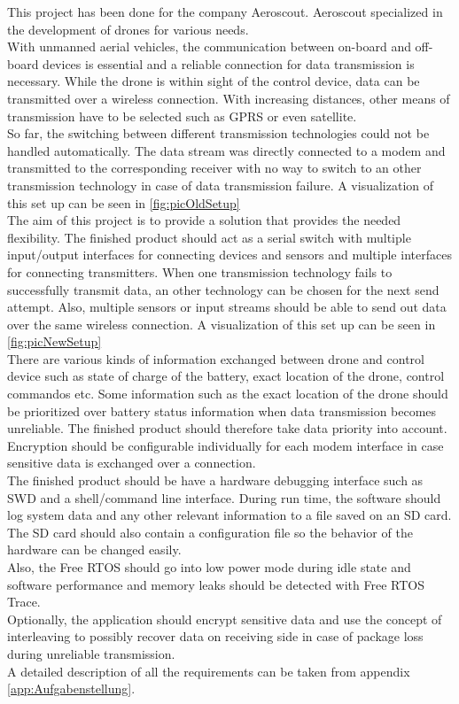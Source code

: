 %
\label{sec:txtAufgabenstellung}
This project has been done for the company Aeroscout. Aeroscout specialized in the development of drones for various needs. \\
With unmanned aerial vehicles, the communication between on-board and off-board devices is essential and a reliable connection for data transmission is necessary. While the drone is within sight of the control device, data can be transmitted over a wireless connection. With increasing distances, other means of transmission have to be selected such as GPRS or even satellite.\\
So far, the switching between different transmission technologies could not be handled automatically. The data stream was directly connected to a modem and transmitted to the corresponding receiver with no way to switch to an other transmission technology in case of data transmission failure. A visualization of this set up can be seen in \autoref{fig:picOldSetup}\\
%
The aim of this project is to provide a solution that provides the needed flexibility. The finished product should act as a serial switch with multiple input/output interfaces for connecting devices and sensors and multiple interfaces for connecting transmitters. When one transmission technology fails to successfully transmit data, an other technology can be chosen for the next send attempt. Also, multiple sensors or input streams should be able to send out data over the same wireless connection. A visualization of this set up can be seen in \autoref{fig:picNewSetup}\\
%
There are various kinds of information exchanged between drone and control device such as state of charge of the battery, exact location of the drone, control commandos etc. Some information such as the exact location of the drone should be prioritized over battery status information when data transmission becomes unreliable. The finished product should therefore take data priority into account. \\
Encryption should be configurable individually for each modem interface in case sensitive data is exchanged over a connection. \\
The finished product should be have a hardware debugging interface such as SWD and a shell/command line interface. During run time, the software should log system data and any other relevant information to a file saved on an SD card. The SD card should also contain a configuration file so the behavior of the hardware can be changed easily. \\
Also, the Free RTOS should go into low power mode during idle state and software performance and memory leaks should be detected with Free RTOS Trace.\\
Optionally, the application should encrypt sensitive data and use the concept of interleaving to possibly recover data on receiving side in case of package loss during unreliable transmission.\\
A detailed description of all the requirements can be taken from appendix \autoref{app:Aufgabenstellung}.